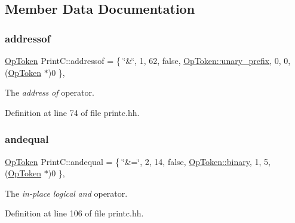 \subsection{Member Data Documentation}
\mbox{\label{class_print_c_a649c182bea1361be38d072a5c0cd4ec4}} 
\subsubsection{\texorpdfstring{addressof}{addressof}}
{\footnotesize\ttfamily \mbox{\hyperlink{class_op_token}{Op\+Token}} Print\+C\+::addressof = \{ \char`\"{}\&\char`\"{}, 1, 62, false, \mbox{\hyperlink{class_op_token_af41c7f108d5662ede7765c5a6c44eaffa0d809c13f66611247b81856fc9e68289}{Op\+Token\+::unary\+\_\+prefix}}, 0, 0, (\mbox{\hyperlink{class_op_token}{Op\+Token}} $\ast$)0 \}\hspace{0.3cm}{\ttfamily [static]}, {\ttfamily [protected]}}



The {\itshape address} {\itshape of} operator. 



Definition at line 74 of file printc.\+hh.

\mbox{\label{class_print_c_a5a70496101762ba761af28c874820f51}} 
\subsubsection{\texorpdfstring{andequal}{andequal}}
{\footnotesize\ttfamily \mbox{\hyperlink{class_op_token}{Op\+Token}} Print\+C\+::andequal = \{ \char`\"{}\&=\char`\"{}, 2, 14, false, \mbox{\hyperlink{class_op_token_af41c7f108d5662ede7765c5a6c44eaffa3a2ec63522a9329a71ddbe8adc3e752d}{Op\+Token\+::binary}}, 1, 5, (\mbox{\hyperlink{class_op_token}{Op\+Token}} $\ast$)0 \}\hspace{0.3cm}{\ttfamily [static]}, {\ttfamily [protected]}}



The {\itshape in-\/place} {\itshape logical} {\itshape and} operator. 



Definition at line 106 of file printc.\+hh.

\mbox{\label{class_print_c_a4e61d18c5dc768e42f9be42619d63b37}} 
